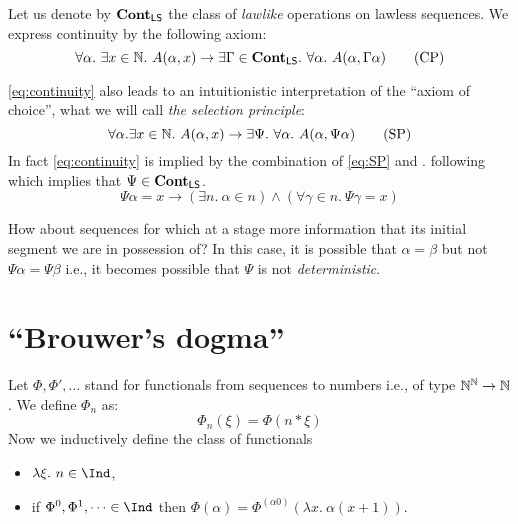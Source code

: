\documentclass[11pt]{article}
\begin{document}
Let us denote by $\mathbf{Cont_{\mathsf{LS}}}$ the class of \emph{lawlike} operations on lawless
sequences. We express continuity by the following axiom:
\begin{equation}\label{eq:continuity}
  \forall \alpha.\ \exists x \in \mathbb{N}.\ A(\alpha, x) \rightarrow \exists
  \Gamma \in \mathbf{Cont_{\mathsf{LS}}}.\ \forall \alpha.\ A(\alpha, \Gamma\alpha)
  \tag{CP}
\end{equation}

\ref{eq:continuity} also leads to an intuitionistic interpretation of the
``axiom of choice'', what we will call \emph{the selection principle}:
\begin{equation}\label{eq:SP}
  \forall \alpha. \exists x \in \mathbb{N}.\ A(\alpha, x)
  \rightarrow \exists \Psi.\ \forall \alpha.\ A(\alpha, \Psi\alpha)
  \tag{SP}
\end{equation}
In fact \ref{eq:continuity} is implied by the combination of \ref{eq:SP} and
\LSIII.
following which implies that $\Psi \in \mathbf{Cont_{\mathsf{LS}}}$.
\begin{equation*}
\Psi\alpha = x \rightarrow (\exists n.\ \alpha \in n) \land
    (\forall \gamma \in n.\ \Psi\gamma = x) \tag{by \LSIII}
\end{equation*}

How about sequences for which at a stage more information that its initial
segment we are in possession of? In this case, it is possible that
$\alpha = \beta$ but not $\Psi\alpha = \Psi\beta$ i.e., it becomes possible
that $\Psi$ is not \emph{deterministic}.
\vspace{1em}

\section{``Brouwer's dogma''}

Let $\Phi, \Phi', \dots$ stand for functionals from sequences to numbers i.e.,
of type $\mathbb{N}^{\mathbb{N}} \rightarrow \mathbb{N}$. We define $\Phi_n$ as:
\[ \Phi_n(\xi) = \Phi(n * \xi) \]
Now we inductively define the class of functionals
\begin{itemize}
  \item $\lambda \xi.\ n \in \Ind$,
  \item if $\Phi^0, \Phi^1, \dots \in \Ind$ then
  $\Phi(\alpha) = \Phi^{(\alpha0)}(\lambda x.\ \alpha(x+1))$.
\end{itemize}



\end{document}
